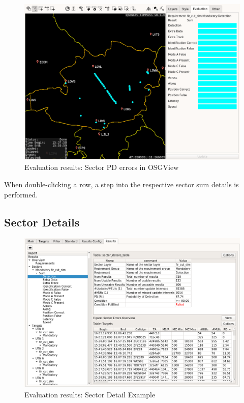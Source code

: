 \begin{figure}[H]
  \hspace*{-2.5cm}
    \includegraphics[width=19cm,frame]{figures/eval_results_pd_sum_osgview.png}
  \caption{Evaluation results: Sector PD errors in OSGView}
\end{figure}

When double-clicking a row, a step into the respective sector sum details is performed.

\subsection{Sector Details}

\begin{figure}[H]
  \hspace*{-2cm}
    \includegraphics[width=18cm,frame]{figures/eval_results_sec_det_example.png}
  \caption{Evaluation results: Sector Detail Example}
\end{figure}

